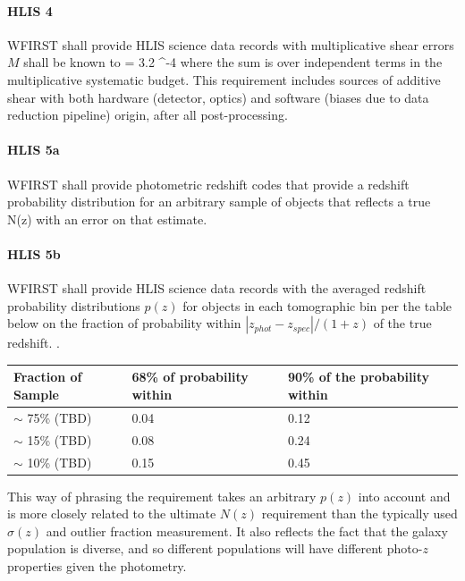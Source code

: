 \paragraph{HLIS 4} WFIRST shall provide HLIS science data records with multiplicative shear
errors $M$ shall be known to
\bea
{} = 3.2 ^{-4}
\eea
where the sum is over independent terms in the multiplicative systematic budget.
This requirement includes sources of additive shear with both hardware
(detector, optics) and software (biases due to data reduction pipeline) origin,
after all post-processing.

\paragraph{HLIS 5a} WFIRST shall provide photometric redshift codes that provide a
redshift probability distribution for an arbitrary sample of objects that
reflects a true N(z) with an error on that estimate.

\paragraph{HLIS 5b} WFIRST shall provide HLIS science data records with the
averaged redshift probability distributions $p(z)$ for objects in each tomographic
bin per the table below on the fraction of probability within
$|z_{phot}-z_{spec}|/(1+z)$ of the true redshift. .

\begin{table}[h]
\begin{center}
\begin{tabular}{@{}|l|l|l|@{}}
\hline
Fraction of Sample & 68\% of probability within & 90\% of the probability within\\
\hline
$\sim$ 75\% (TBD) & 0.04 & 0.12\\
$\sim$ 15\% (TBD) & 0.08 & 0.24\\
$\sim$ 10\% (TBD) & 0.15 & 0.45\\
\hline
\end{tabular}
\end{center}
\end{table}
This way of phrasing the requirement takes an arbitrary $p(z)$ into account and
is more closely related to the ultimate $N(z)$ requirement than the typically used
$\sigma(z)$ and outlier fraction measurement.  It also reflects the fact that the galaxy
population is diverse, and so different populations will have different photo-$z$
properties given the photometry.

